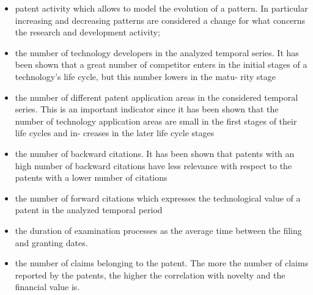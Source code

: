 \documentclass[]{book}
\providecommand{\tightlist}{%
  \setlength{\itemsep}{0pt}\setlength{\parskip}{0pt}}
\begin{document}
\begin{itemize}
\tightlist
\item
  patent activity which allows to model the evolution of a pattern. In
  particular increasing and decreasing patterns are considered a change
  for what concerns the research and development activity;
\item
  the number of technology developers in the analyzed temporal series.
  It has been shown that a great number of competitor enters in the
  initial stages of a technology's life cycle, but this number lowers in
  the matu- rity stage
\item
  the number of different patent application areas in the considered
  temporal series. This is an important indicator since it has been
  shown that the number of technology application areas are small in the
  first stages of their life cycles and in- creases in the later life
  cycle stages
\item
  the number of backward citations. It has been shown that patents with
  an high number of backward citations have less relevance with respect
  to the patents with a lower number of citations
\item
  the number of forward citations which expresses the technological
  value of a patent in the analyzed temporal period
\item
  the duration of examination processes as the average time between the
  filing and granting dates.
\item
  the number of claims belonging to the patent. The more the number of
  claims reported by the patents, the higher the correlation with
  novelty and the financial value is.
\end{itemize}
\end{document}

